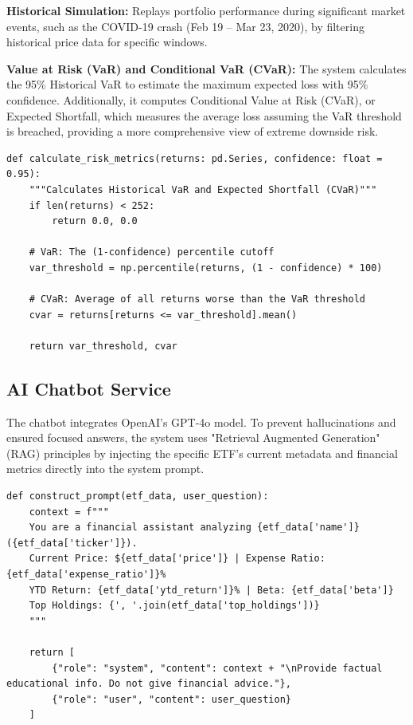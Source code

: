 \textbf{Historical Simulation:}
Replays portfolio performance during significant market events, such as the COVID-19 crash (Feb 19 -- Mar 23, 2020), by filtering historical price data for specific windows.

\textbf{Value at Risk (VaR) and Conditional VaR (CVaR):}
The system calculates the 95\% Historical VaR to estimate the maximum expected loss with 95\% confidence. Additionally, it computes Conditional Value at Risk (CVaR), or Expected Shortfall, which measures the average loss assuming the VaR threshold is breached, providing a more comprehensive view of extreme downside risk.

\begin{lstlisting}[style=pythonstyle, caption={VaR and CVaR Calculation}]
def calculate_risk_metrics(returns: pd.Series, confidence: float = 0.95):
    """Calculates Historical VaR and Expected Shortfall (CVaR)"""
    if len(returns) < 252:
        return 0.0, 0.0
        
    # VaR: The (1-confidence) percentile cutoff
    var_threshold = np.percentile(returns, (1 - confidence) * 100)
    
    # CVaR: Average of all returns worse than the VaR threshold
    cvar = returns[returns <= var_threshold].mean()
    
    return var_threshold, cvar
\end{lstlisting}

\subsection{AI Chatbot Service}

The chatbot integrates OpenAI’s GPT-4o model. To prevent hallucinations and ensured focused answers, the system uses "Retrieval Augmented Generation" (RAG) principles by injecting the specific ETF's current metadata and financial metrics directly into the system prompt.

\begin{lstlisting}[style=pythonstyle, caption={AI System Prompt Construction}]
def construct_prompt(etf_data, user_question):
    context = f"""
    You are a financial assistant analyzing {etf_data['name']} ({etf_data['ticker']}).
    Current Price: ${etf_data['price']} | Expense Ratio: {etf_data['expense_ratio']}%
    YTD Return: {etf_data['ytd_return']}% | Beta: {etf_data['beta']}
    Top Holdings: {', '.join(etf_data['top_holdings'])}
    """
    
    return [
        {"role": "system", "content": context + "\nProvide factual educational info. Do not give financial advice."},
        {"role": "user", "content": user_question}
    ]
\end{lstlisting}

